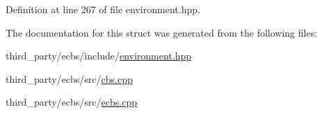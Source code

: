 Definition at line 267 of file environment.\+hpp.



The documentation for this struct was generated from the following files\+:\begin{DoxyCompactItemize}
\item 
third\+\_\+party/ecbs/include/\hyperlink{environment_8hpp}{environment.\+hpp}\item 
third\+\_\+party/ecbs/src/\hyperlink{cbs_8cpp}{cbs.\+cpp}\item 
third\+\_\+party/ecbs/src/\hyperlink{ecbs_8cpp}{ecbs.\+cpp}\end{DoxyCompactItemize}
